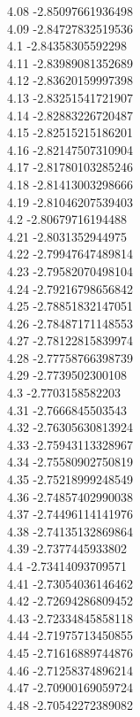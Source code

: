 {4.08	-2.85097661936498\\
4.09	-2.84727832519536\\
4.1	-2.84358305592298\\
4.11	-2.83989081352689\\
4.12	-2.83620159997398\\
4.13	-2.83251541721907\\
4.14	-2.82883226720487\\
4.15	-2.82515215186201\\
4.16	-2.82147507310904\\
4.17	-2.81780103285246\\
4.18	-2.81413003298666\\
4.19	-2.81046207539403\\
4.2	-2.80679716194488\\
4.21	-2.8031352944975\\
4.22	-2.79947647489814\\
4.23	-2.79582070498104\\
4.24	-2.79216798656842\\
4.25	-2.78851832147051\\
4.26	-2.78487171148553\\
4.27	-2.78122815839974\\
4.28	-2.77758766398739\\
4.29	-2.7739502300108\\
4.3	-2.7703158582203\\
4.31	-2.7666845503543\\
4.32	-2.76305630813924\\
4.33	-2.75943113328967\\
4.34	-2.75580902750819\\
4.35	-2.75218999248549\\
4.36	-2.74857402990038\\
4.37	-2.74496114141976\\
4.38	-2.74135132869864\\
4.39	-2.7377445933802\\
4.4	-2.73414093709571\\
4.41	-2.73054036146462\\
4.42	-2.72694286809452\\
4.43	-2.72334845858118\\
4.44	-2.71975713450855\\
4.45	-2.71616889744876\\
4.46	-2.71258374896214\\
4.47	-2.70900169059724\\
4.48	-2.70542272389082\\
}
